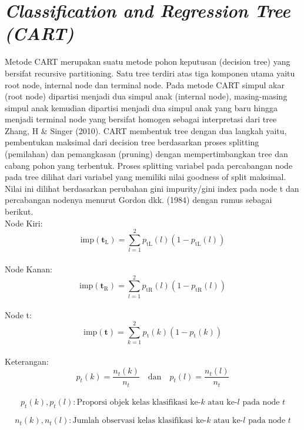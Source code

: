 \section{\textit{Classification and Regression Tree (CART)}}
Metode CART merupakan suatu metode pohon keputusan (decision tree) yang bersifat recursive partitioning. Satu tree terdiri atas tiga komponen utama yaitu root node, internal node dan terminal node. Pada metode CART simpul akar (root node) dipartisi menjadi dua simpul anak (internal node), masing-masing simpul anak kemudian dipartisi menjadi dua simpul anak yang baru hingga menjadi terminal node yang bersifat homogen sebagai interpretasi dari tree Zhang, H \& Singer (2010). CART membentuk tree dengan dua langkah yaitu, pembentukan maksimal dari decision tree berdasarkan proses splitting (pemilahan) dan pemangkasan (pruning) dengan mempertimbangkan tree dan cabang pohon yang terbentuk. Proses splitting variabel pada percabangan node pada tree dilihat dari variabel yang memiliki nilai goodness of split maksimal. Nilai ini dilihat berdasarkan perubahan gini impurity/gini index pada node t dan percabangan nodenya menurut Gordon dkk. (1984) dengan rumus sebagai berikut.
\\
Node Kiri:
\begin{equation}
    \text{imp}(\mathbf{t}_{\text{L}}) = \sum_{l=1}^{2} p_{\text{tL}}(l)(1 - p_{\text{tL}}(l))
\end{equation}
\\
Node Kanan:
\begin{equation}
    \text{imp}(\mathbf{t}_{\text{R}}) = \sum_{l=1}^{2} p_{\text{tR}}(l)(1 - p_{\text{tR}}(l))
    \end{equation}
\\ 
Node t:
\begin{equation}
    \text{imp}(\mathbf{t}) = \sum_{k=1}^{2} p_{\text{t}}(k)(1 - p_{\text{t}}(k))
    \end{equation}
\\
Keterangan:
\begin{equation}
    p_{t}(k) = \frac{n_{t}(k)}{n_{t}} \quad \text{dan} \quad p_{t}(l) = \frac{n_{t}(l)}{n_{t}}
    \end{equation}
\\
\begin{equation}
    p_{t}(k), p_{t}(l) : \text{Proporsi objek kelas klasifikasi ke-} k \text{ atau ke-} l \text{ pada node } t
    \end{equation}
    
    \begin{equation}
    n_{t}(k), n_{t}(l) : \text{Jumlah observasi kelas klasifikasi ke-} k \text{ atau ke-} l \text{ pada node } t
    \end{equation}
    
